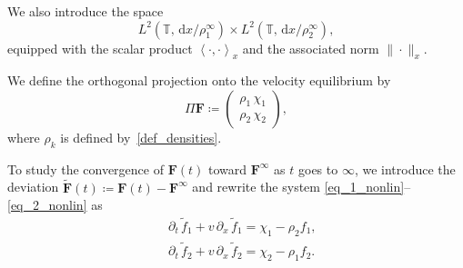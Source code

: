 \documentclass[reqno]{amsart}
\newcommand{\dt}{\,\partial_t\, }
\newcommand{\dx}{\,\partial_x\, }
\newcommand{\dd}{\,\mathrm{d}}
\newcommand{\T}{\mathbb{T}}
\newcommand{\ft}{\widetilde{f}}
\newcommand{\Ft}{{\widetilde{F}}}
\newcommand{\Ftbf}{\mathbf{\Ft}}
\newcommand{\Fbf}{\mathbf{F}}
\newcommand{\lla}{\left\langle}
\newcommand{\rra}{\right\rangle}
\numberwithin{equation}{section}
\begin{document}
We also introduce the space
\[ L^2(\T, \dd x/\rho_1^\infty)\times L^2(\T, \dd x/\rho_2^\infty),  \]
equipped with the scalar product $\lla \cdot,\cdot\rra_x$ and the associated norm $\|\cdot\|_x$.

We define the orthogonal projection onto the velocity equilibrium by
\[\Pi \Fbf\coloneq \begin{pmatrix}\rho_1\,\chi_1 \\ \rho_2\,\chi_2\end{pmatrix},\]
where $\rho_k$ is defined by~\eqref{def_densities}.

To study the convergence of $\Fbf(t)$ toward $\Fbf^\infty$ as $t$ goes to $\infty$, we introduce the deviation $\Ftbf(t)\coloneq \Fbf(t)-\Fbf^\infty$ and rewrite the system  \eqref{eq_1_nonlin}--\eqref{eq_2_nonlin} as
\begin{align}
    &\dt \ft_1 + v\dx \ft_1 = \chi_1 - \rho_2 f_1, \label{eq_1tilde_nonlin}\\
    &\dt \ft_2 + v\dx \ft_2 = \chi_2 - \rho_1 f_2. \label{eq_2tilde_nonlin}
\end{align}
\end{document}

